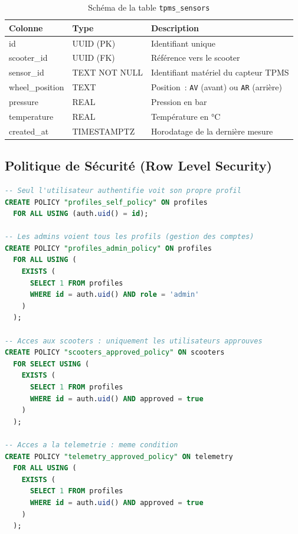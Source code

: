 \documentclass[12pt, a4paper]{report}
\begin{document}
\begin{table}[H]
  \centering
  \caption{Schéma de la table \texttt{tpms\_sensors}}
  \label{tab:table_tpms}
  \renewcommand{\arraystretch}{1.4}
  \small
  \begin{tabularx}{\textwidth}{|p{3cm}|p{2.5cm}|X|}
    \hline
    \rowcolor{isimablue!20}
    \textbf{Colonne} & \textbf{Type} & \textbf{Description} \\
    \hline
    id             & UUID (PK)   & Identifiant unique \\
    \hline
    scooter\_id    & UUID (FK)   & Référence vers le scooter \\
    \hline
    sensor\_id     & TEXT NOT NULL & Identifiant matériel du capteur TPMS \\
    \hline
    wheel\_position & TEXT       & Position~: \texttt{AV} (avant) ou \texttt{AR} (arrière) \\
    \hline
    pressure       & REAL        & Pression en bar \\
    \hline
    temperature    & REAL        & Température en °C \\
    \hline
    created\_at    & TIMESTAMPTZ & Horodatage de la dernière mesure \\
    \hline
  \end{tabularx}
\end{table}

\subsection{Politique de Sécurité (Row Level Security)}

\begin{lstlisting}[language=SQL, caption={Politiques RLS sur les tables principales}]
-- Seul l'utilisateur authentifie voit son propre profil
CREATE POLICY "profiles_self_policy" ON profiles
  FOR ALL USING (auth.uid() = id);

-- Les admins voient tous les profils (gestion des comptes)
CREATE POLICY "profiles_admin_policy" ON profiles
  FOR ALL USING (
    EXISTS (
      SELECT 1 FROM profiles
      WHERE id = auth.uid() AND role = 'admin'
    )
  );

-- Acces aux scooters : uniquement les utilisateurs approuves
CREATE POLICY "scooters_approved_policy" ON scooters
  FOR SELECT USING (
    EXISTS (
      SELECT 1 FROM profiles
      WHERE id = auth.uid() AND approved = true
    )
  );

-- Acces a la telemetrie : meme condition
CREATE POLICY "telemetry_approved_policy" ON telemetry
  FOR ALL USING (
    EXISTS (
      SELECT 1 FROM profiles
      WHERE id = auth.uid() AND approved = true
    )
  );
\end{lstlisting}
\end{document}
